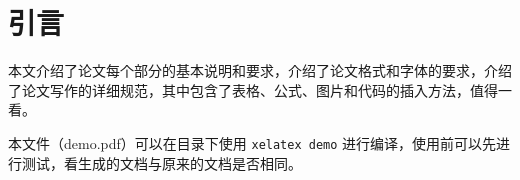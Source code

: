 \chapter{引言}
\label{chap:references}
本文介绍了论文每个部分的基本说明和要求，介绍了论文格式和字体的要求，介绍了论文写作的详细规范，其中包含了表格、公式、图片和代码的插入方法，值得一看。

本文件（demo.pdf）可以在目录下使用 \lstinline|xelatex demo| 进行编译，使用前可以先进行测试，看生成的文档与原来的文档是否相同。

